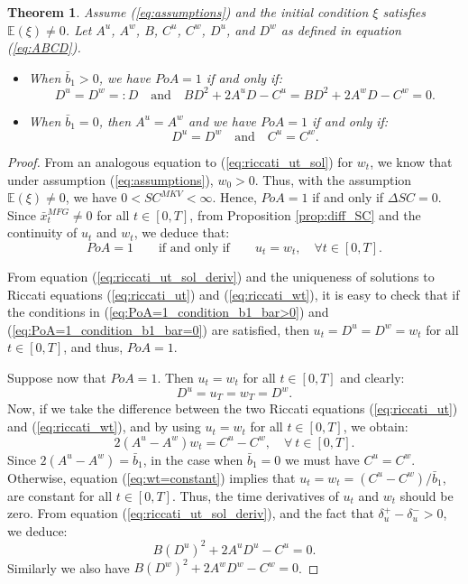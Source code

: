 \documentclass[11pt]{article}
\newtheorem{theorem}{Theorem}
\begin{document}
\begin{theorem}
	Assume (\ref{eq:assumptions}) and the initial condition $\xi$ satisfies $\mathbb{E}(\xi)  \neq 0$. Let $A^u$, $A^w$, $B$, $C^u$, $C^w$, $D^u$, and $D^w$ as defined in equation (\ref{eq:ABCD}).
	\begin{itemize}
		\item When $\bar{b}_1 > 0$, we have $PoA = 1$ if and only if:
		\begin{equation}
		D^u = D^w =:D \quad \text{and} \quad B D^2 + 2 A^{u} D - C^{u} = B D^2 + 2 A^{w} D - C^w  = 0.
		\label{eq:PoA=1_condition_b1_bar>0}
		\end{equation}
		\item When $\bar{b}_1 = 0$, then $A^u = A^w$ and we have $PoA = 1$ if and only if:
		\begin{equation}
			D^u = D^w \quad \text{and} \quad C^u = C^w. 
		\label{eq:PoA=1_condition_b1_bar=0}
		\end{equation}
	\end{itemize}
	\label{thm:PoA_equivalent_1}
\end{theorem}

\begin{proof}
	From an analogous equation to (\ref{eq:riccati_ut_sol}) for $w_t$, we know that under assumption (\ref{eq:assumptions}), $w_0>0$. Thus, with the assumption $\mathbb{E}(\xi) \neq 0$, we have $0 < SC^{MKV} < \infty$. Hence, $PoA =1$ if and only if $\Delta SC = 0$. Since $\bar{x}_t^{MFG} \neq 0$ for all $t \in [0,T]$, from Proposition \ref{prop:diff_SC} and the continuity of $u_t$ and $w_t$, we deduce that:
	\begin{equation*}
		PoA = 1 \qquad \text{if and only if} \qquad u_t = w_t, \quad \forall  t \in [0,T]. 
	\end{equation*}
	
	From equation (\ref{eq:riccati_ut_sol_deriv}) and the uniqueness of solutions to Riccati equations (\ref{eq:riccati_ut}) and (\ref{eq:riccati_wt}), it is easy to check that if the conditions in (\ref{eq:PoA=1_condition_b1_bar>0}) and (\ref{eq:PoA=1_condition_b1_bar=0}) are satisfied, then $u_t=D^u=D^w = w_t$ for all $ t\in [0,T]$, and thus, $PoA = 1$.	
	
	Suppose now that $PoA =1$. Then $u_t = w_t$ for all $t \in [0,T]$ and clearly:
	$$D^u = u_T = w_T = D^w.$$
	Now, if we take the difference between the two Riccati equations (\ref{eq:riccati_ut}) and (\ref{eq:riccati_wt}), and by using $u_t = w_t$ for all $t \in [0,T]$, we obtain:
	\begin{equation}
		2 (A^u - A^w) w_t = C^u - C^w, \quad \forall \  t \in [0,T].
	\label{eq:wt=constant}
	\end{equation}
	Since $2(A^u - A^w) = \bar{b}_1$, in the case when $\bar{b}_1 =0$ we must have $C^u = C^w$. Otherwise, equation (\ref{eq:wt=constant}) implies that $u_t = w_t = (C^u - C^w) / \bar{b}_1 $, are constant for all $t \in [0,T]$. Thus, the time derivatives of $u_t$ and $w_t$ should be zero. From equation (\ref{eq:riccati_ut_sol_deriv}), and the fact that $\delta_u^+ - \delta_u^- > 0$, we deduce: 
	$$ B (D^{u})^2 + 2 A^u D^u - C^u = 0.$$
	Similarly we also have $B (D^{w})^2 + 2 A^w D^w - C^w = 0$. 
	
\end{proof}
\end{document}
